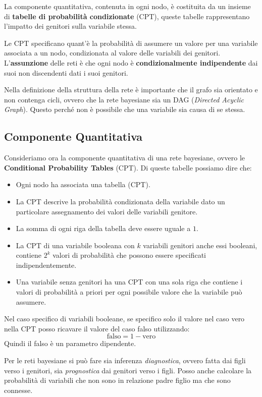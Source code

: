 La componente quantitativa, contenuta in ogni nodo, è costituita da un insieme di
\textbf{tabelle di probabilità condizionate} (CPT), queste tabelle rappresentano
l'impatto dei genitori sulla variabile stessa.

Le CPT specificano quant'è la probabilità di assumere un valore per una variabile
associata a un nodo, condizionata al valore delle variabili dei genitori.
L'\textbf{assunzione} delle reti è che ogni nodo è \textbf{condizionalmente
    indipendente} dai suoi non discendenti dati i suoi genitori.

Nella definizione della struttura della rete è importante che il grafo sia orientato
e non contenga cicli, ovvero che la rete bayesiane sia un DAG (\textit{Directed
    Acyclic Graph}). Questo perché non è possibile che una variabile sia causa
di se stessa.

\subsection{Componente Quantitativa}
Consideriamo ora la componente quantitativa di una rete bayesiane, ovvero le
\textbf{Conditional Probability Tables} (CPT). Di queste tabelle possiamo dire che:
\begin{itemize}
    \item Ogni nodo ha associata una tabella (CPT).
    \item La CPT descrive la probabilità condizionata della variabile dato un
          particolare assegnamento dei valori delle variabili genitore.
    \item La somma di ogni riga della tabella deve essere uguale a $1$.
    \item La CPT di una variabile booleana con $k$ variabili genitori anche essi
          booleani, contiene $2^k$ valori di probabilità che possono essere
          specificati indipendentemente.
    \item Una variabile senza genitori ha una CPT con una sola riga che contiene
          i valori di probabilità a priori per ogni possibile valore che la
          variabile può assumere.
\end{itemize}
\begin{nota}
    Nel caso specifico di variabili booleane, se specifico solo il valore nel
    caso vero nella CPT posso ricavare il valore del caso falso utilizzando:
    \begin{equation*}
        \text{falso} = 1 - \text{vero}
    \end{equation*}
    Quindi il falso è un parametro dipendente.
\end{nota}
Per le reti bayesiane si può fare sia inferenza \textit{diagnostica}, ovvero fatta
dai figli verso i genitori, sia \textit{prognostica} dai genitori verso i figli.
Posso anche calcolare la probabilità di variabili che non sono in relazione padre
figlio ma che sono connesse.

